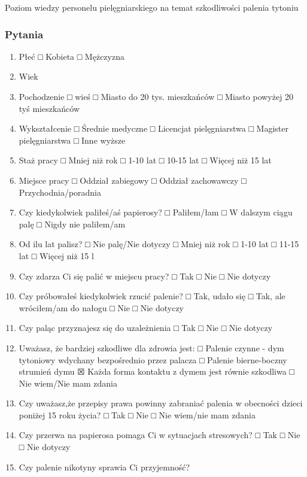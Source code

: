 \documentclass[
  openany]{book}
\begin{document}
Poziom wiedzy personelu pielęgniarskiego na temat szkodliwości palenia tytoniu

\hypertarget{pytania-1}{%
\subsubsection{Pytania}\label{pytania-1}}

\begin{enumerate}
\def\labelenumi{\arabic{enumi}.}
\item
  Płeć
  □ Kobieta
  □ Mężczyzna
\item
  Wiek
\item
  Pochodzenie
  □ wieś
  □ Miasto do 20 tys. mieszkańców
  □ Miasto powyżej 20 tyś mieszkańców
\item
  Wykształcenie
  □ Średnie medyczne
  □ Licencjat pielęgniarstwa
  □ Magister pielęgniarstwa
  □ Inne wyższe
\item
  Staż pracy
  □ Mniej niż rok
  □ 1-10 lat
  □ 10-15 lat
  □ Więcej niż 15 lat
\item
  Miejsce pracy
  □ Oddział zabiegowy
  □ Oddział zachowawczy
  □ Przychodnia/poradnia
\item
  Czy kiedykolwiek paliłeś/aś papierosy?
  □ Paliłem/łam
  □ W dalszym ciągu palę
  □ Nigdy nie paliłem/am
\item
  Od ilu lat palisz?
  □ Nie palę/Nie dotyczy
  □ Mniej niż rok
  □ 1-10 lat
  □ 11-15 lat
  □ Więcej niż 15 l
\item
  Czy zdarza Ci się palić w miejscu pracy?
  □ Tak
  □ Nie
  □ Nie dotyczy
\item
  Czy próbowałeś kiedykolwiek rzucić palenie?
  □ Tak, udało się
  □ Tak, ale wróciłem/am do nałogu
  □ Nie
  □ Nie dotyczy
\item
  Czy paląc przyznajesz się do uzależnienia
  □ Tak
  □ Nie
  □ Nie dotyczy
\item
  Uważasz, że bardziej szkodliwe dla zdrowia jest:
  □ Palenie czynne - dym tytoniowy wdychany bezpośrednio przez palacza
  □ Palenie bierne-boczny strumień dymu
  ☒ Każda forma kontaktu z dymem jest równie szkodliwa
  □ Nie wiem/Nie mam zdania
\item
  Czy uważasz,że przepisy prawa powinny zabraniać palenia w obecności dzieci
  poniżej 15 roku życia?
  □ Tak
  □ Nie
  □ Nie wiem/nie mam zdania
\item
  Czy przerwa na papierosa pomaga Ci w sytuacjach stresowych?
  □ Tak
  □ Nie
  □ Nie dotyczy
\item
  Czy palenie nikotyny sprawia Ci przyjemność?

\end{enumerate}
\end{document}
